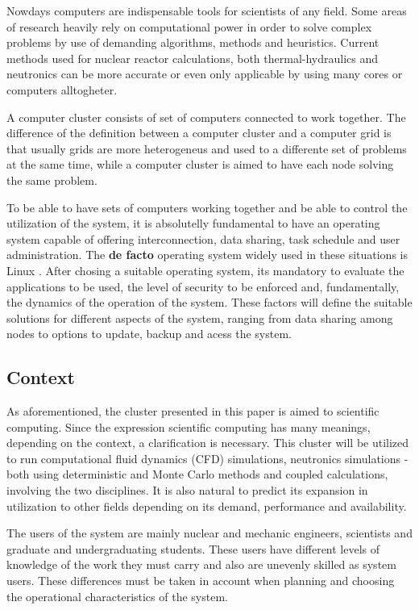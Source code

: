 \documentclass[twoside,a4paper,12pt,english,draft]{inac17}
\begin{document}
Nowdays computers are indispensable tools for scientists of any field.
Some areas of research heavily rely on computational power in order to solve
complex problems by use of demanding algorithms, methods and heuristics.
Current methods used for nuclear reactor calculations, both thermal-hydraulics
and neutronics can be more accurate or even only applicable by using
many cores or computers alltogheter.

A computer cluster consists of set of computers connected to work together. The difference of the
definition between a computer cluster and a computer grid is that usually grids are more
heterogeneus and used to a differente set of problems at the same time, while a computer
cluster is aimed to have each node solving the same problem.

To be able to have sets of computers working together and be able to control the utilization of the system,
it is absolutelly fundamental to have an operating system capable of offering interconnection, data sharing,
task schedule and user administration. The \textbf{de facto} operating system widely used in these situations
is Linux \cite{Linux}. After chosing a suitable operating system, its mandatory to evaluate the applications to
be used, the level of security to be enforced and, fundamentally, the dynamics of the operation of the system.
These factors will define the suitable solutions for different aspects of the system, ranging from data
sharing among nodes to options to update, backup and acess the system.



\subsection{Context}

As aforementioned, the cluster presented in this paper is aimed to scientific computing.
Since the expression scientific computing has many meanings, depending on the context, a
clarification is necessary. This cluster will be utilized to run computational fluid dynamics
(CFD) simulations, neutronics simulations - both using deterministic and Monte Carlo \cite{MC}
methods and coupled calculations, involving the two disciplines. It is also natural to predict
its expansion in utilization to other fields depending on its demand, performance and availability.

The users of the system are mainly nuclear and mechanic engineers, scientists and graduate
and undergraduating students. These users have different levels of knowledge of the work
they must carry and also are unevenly skilled as system users. These differences must be taken
in account when planning and choosing the operational characteristics of the system.
\end{document}
